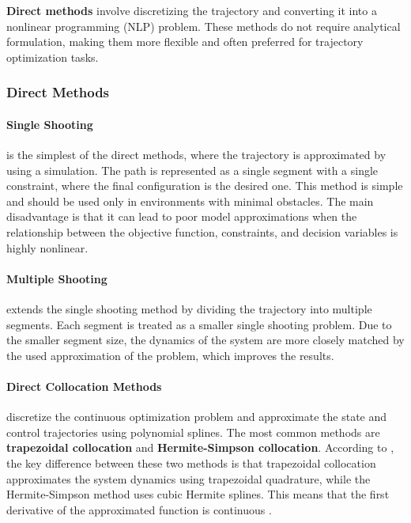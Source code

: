 \textbf{Direct methods} involve discretizing the trajectory and converting it into a nonlinear programming (NLP) problem. These methods do not require analytical formulation, making them more flexible and often preferred for trajectory optimization tasks.

\subsubsection{Direct Methods}
\paragraph{Single Shooting} is the simplest of the direct methods, where the trajectory is approximated by using a simulation. The path is represented as a single segment with a single constraint, where the final configuration is the desired one. This method is simple and should be used only in environments with minimal obstacles. The main disadvantage is that it can lead to poor model approximations when the relationship between the objective function, constraints, and decision variables is highly nonlinear.

\paragraph{Multiple Shooting} extends the single shooting method by dividing the trajectory into multiple segments. Each segment is treated as a smaller single shooting problem. Due to the smaller segment size, the dynamics of the system are more closely matched by the used approximation of the problem, which improves the results.

\paragraph{Direct Collocation Methods} discretize the continuous optimization problem and approximate the state and control trajectories using polynomial splines. The most common methods are \textbf{trapezoidal collocation} and \textbf{Hermite-Simpson collocation}. According to \cite{betts2010practical}, the key difference between these two methods is that trapezoidal collocation approximates the system dynamics using trapezoidal quadrature, while the Hermite-Simpson method uses cubic Hermite splines. This means that the first derivative of the approximated function is continuous \cite{kelly2017introduction}.

